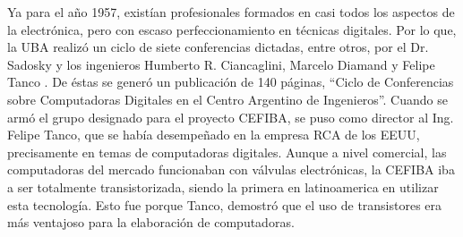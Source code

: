 \documentclass[%
 	final,
%
	notitlepage,
	narroweqnarray,
	inline,
 	twoside,
	]{ieee}
\begin{document}
Ya para el a\~no 1957, exist\'ian profesionales formados en casi todos los aspectos de la electr\'onica, pero con escaso perfeccionamiento en t\'ecnicas digitales. Por lo que, la UBA realiz\'o un ciclo de siete conferencias dictadas, entre otros, por el Dr. Sadosky y los ingenieros Humberto R. Ciancaglini, Marcelo Diamand y Felipe Tanco . De \'estas se gener\'o un publicaci\'on de 140 p\'aginas, ``Ciclo de Conferencias sobre Computadoras Digitales en el Centro Argentino de Ingenieros''.
Cuando se arm\'o el grupo designado para el proyecto CEFIBA, se puso como director al Ing. Felipe Tanco, que se hab\'ia desempe\~nado en la empresa RCA de los EEUU, precisamente en temas de computadoras digitales. Aunque a nivel comercial, las computadoras del mercado funcionaban con v\'alvulas electr\'onicas, la CEFIBA iba a ser totalmente transistorizada, siendo la primera en latinoamerica en utilizar esta tecnolog\'ia. Esto fue porque Tanco, demostr\'o que el uso de transistores era m\'as ventajoso para la elaboraci\'on de computadoras.
\end{document}
